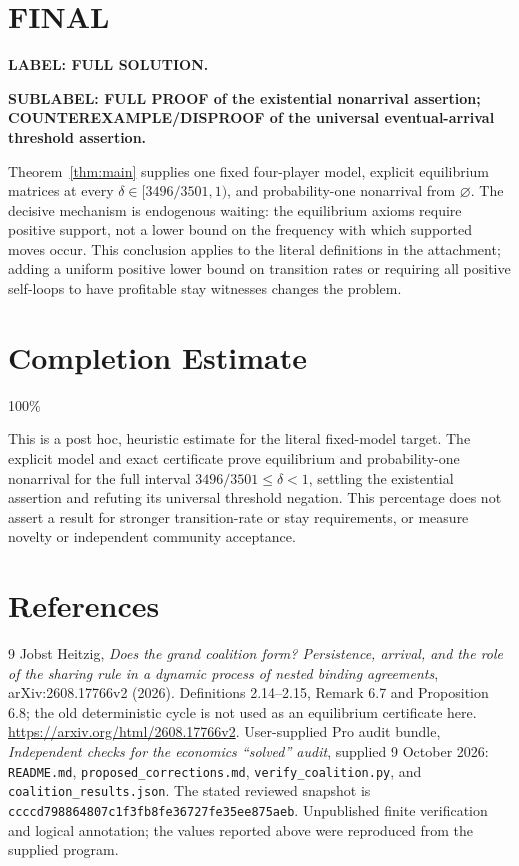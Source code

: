 \documentclass[11pt,a4paper]{article}
\theoremstyle{definition}\newtheorem{definition}[theorem]{Definition}
\theoremstyle{remark}\newtheorem{remark}[theorem]{Remark}
\newcommand{\1}{\mathbf 1}
\begin{document}
\section{FINAL}
\textbf{LABEL: FULL SOLUTION.}

\textbf{SUBLABEL: FULL PROOF of the existential nonarrival assertion; COUNTEREXAMPLE/DISPROOF of the universal eventual-arrival threshold assertion.}

Theorem~\ref{thm:main} supplies one fixed four-player model, explicit equilibrium matrices at every $\delta\in[3496/3501,1)$, and probability-one nonarrival from $\varnothing$. The decisive mechanism is endogenous waiting: the equilibrium axioms require positive support, not a lower bound on the frequency with which supported moves occur. This conclusion applies to the literal definitions in the attachment; adding a uniform positive lower bound on transition rates or requiring all positive self-loops to have profitable stay witnesses changes the problem.

\section{Completion Estimate}
100\%

This is a post hoc, heuristic estimate for the literal fixed-model target.
The explicit model and exact certificate prove equilibrium and probability-one
nonarrival for the full interval $3496/3501\le\delta<1$, settling the
existential assertion and refuting its universal threshold negation. This
percentage does not assert a result for stronger transition-rate or stay
requirements, or measure novelty or independent community acceptance.

\section*{References}
\begin{thebibliography}{9}
Jobst Heitzig, \emph{Does the grand coalition form? Persistence, arrival,
and the role of the sharing rule in a dynamic process of nested binding
agreements}, arXiv:2608.17766v2 (2026). Definitions 2.14--2.15,
Remark 6.7 and Proposition 6.8; the old deterministic cycle is not used
as an equilibrium certificate here.
\url{https://arxiv.org/html/2608.17766v2}.
User-supplied Pro audit bundle, \emph{Independent checks for the economics
``solved'' audit}, supplied 9 October 2026: \texttt{README.md},
\texttt{proposed\_corrections.md}, \texttt{verify\_coalition.py}, and
\texttt{coalition\_results.json}. The stated reviewed snapshot is
\texttt{ccccd798864807c1f3fb8fe36727fe35ee875aeb}. Unpublished finite
verification and logical annotation; the values reported above were
reproduced from the supplied program.
\end{thebibliography}
\end{document}
